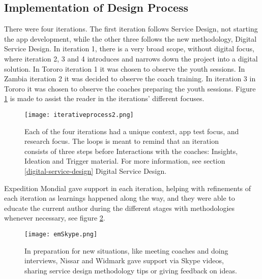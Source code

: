 \subsection{Implementation of Design Process}
There were four iterations. The first iteration follows Service Design, not starting the app development, while the other three follows the new methodology, Digital Service Design. In iteration 1, there is a very broad scope, without digital focus, where iteration 2, 3 and 4 introduces and narrows down the project into a digital solution. In Tororo iteration 1 it was chosen to observe the youth sessions. In Zambia iteration 2 it was decided to observe the coach training. In iteration 3 in Tororo it was chosen to observe the coaches preparing the youth sessions. Figure \ref{fig:methods} is made to assist the reader in the iterations' different focuses.

\begin{figure}[h]
    \centering
    \texttt{[image: iterativeprocess2.png]}
    \caption{Each of the four iterations had a unique context, app test focus, and research focus. The loops is meant to remind that an iteration consists of three steps before Interactions with the coaches: Insights, Ideation and Trigger material. For more information, see section \ref{digital-service-design} Digital Service Design.}
    \label{fig:methods}
\end{figure}

Expedition Mondial gave support in each iteration, helping with refinements of each iteration as learnings happened along the way, and they were able to educate the current author during the different stages with methodologies whenever necessary, see figure \ref{fig:emSkype}.

\begin{figure}[h]
    \centering
    \texttt{[image: emSkype.png]}
    \caption{In preparation for new situations, like meeting coaches and doing interviews, Nissar and Widmark gave support via Skype videos, sharing service design methodology tips or giving feedback on ideas.}
    \label{fig:emSkype}
\end{figure}
